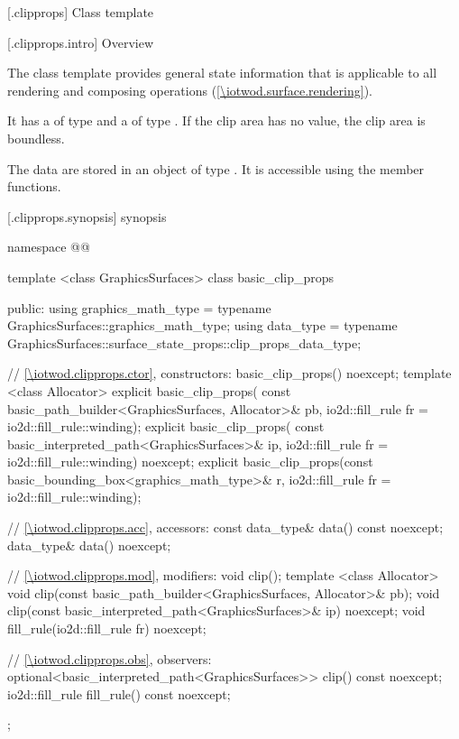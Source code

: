 
 [\iotwod.clipprops] {Class template }

 [\iotwod.clipprops.intro] {Overview}

\pnum
The  class template provides general state information that is applicable to all rendering and composing operations (\ref{\iotwod.surface.rendering}).

\pnum
It has a  of type  and a  of type . If the clip area has no value, the clip area is boundless.

\pnum
The data are stored in an object of type . It is accessible using the  member functions.

 [\iotwod.clipprops.synopsis] { synopsis}

\begin{codeblock}
namespace @\fullnamespace{}@ {
  template <class GraphicsSurfaces>
  class basic_clip_props {
  public:
    using graphics_math_type = typename GraphicsSurfaces::graphics_math_type;
    using data_type =
      typename GraphicsSurfaces::surface_state_props::clip_props_data_type;

    // \ref{\iotwod.clipprops.ctor}, constructors:
    basic_clip_props() noexcept;
    template <class Allocator>
    explicit basic_clip_props(
      const basic_path_builder<GraphicsSurfaces, Allocator>& pb,
      io2d::fill_rule fr = io2d::fill_rule::winding);
    explicit basic_clip_props(
      const basic_interpreted_path<GraphicsSurfaces>& ip,
      io2d::fill_rule fr = io2d::fill_rule::winding) noexcept;
    explicit basic_clip_props(const basic_bounding_box<graphics_math_type>& r,
      io2d::fill_rule fr = io2d::fill_rule::winding);

    // \ref{\iotwod.clipprops.acc}, accessors:
    const data_type& data() const noexcept;
    data_type& data() noexcept;

    // \ref{\iotwod.clipprops.mod}, modifiers:
    void clip();
    template <class Allocator>
    void clip(const basic_path_builder<GraphicsSurfaces, Allocator>& pb);
    void clip(const basic_interpreted_path<GraphicsSurfaces>& ip) noexcept;
    void fill_rule(io2d::fill_rule fr) noexcept;

    // \ref{\iotwod.clipprops.obs}, observers:
    optional<basic_interpreted_path<GraphicsSurfaces>> clip() const noexcept;
    io2d::fill_rule fill_rule() const noexcept;
  };
}
\end{codeblock}

